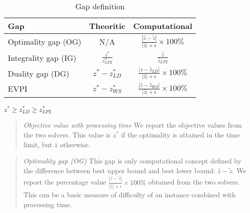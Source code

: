 \begin{table}[H]
	\centering
	\caption{Gap definition}
	\label{table:gap}
	\begin{tabular}{@{}lcc@{}}
		\toprule
		Gap                  & Theoritic  & Computational  \\ \midrule
		Optimality gap (OG)  & N/A & $\frac{|\hat{z}-\tilde{z}|}{|\hat{z}|+\epsilon}\times 100\%$   \\
		Integrality gap (IG) &  $\frac{z^*}{z^*_{LP2}}$          &        $\frac{\hat{z}}{\hat{z}_{LP2}}$       \\
		Duality gap (DG)     &      $z^*-z^*_{LD}$     &        $\frac{|\hat{z}-\hat{z}_{LD}|}{|\hat{z}|+\epsilon}\times 100\%$        \\
		EVPI                 &      $z^*-z^*_{WS}$      &       $\frac{|\hat{z}-\hat{z}_{WS}|}{|\hat{z}|+\epsilon}\times 100\%$         \\ \bottomrule
	\end{tabular}
\end{table}

$z^* \geq z^*_{LD} \geq z^*_{LP2}$

\begin{quote}
	\noindent\textit{Objective value with processing time} We report the objective values from the two solvers. This value is $z^*$ if the optimality is attained in the time limit, but $\hat{z}$ otherwise.
\end{quote}

\begin{quote}
	\noindent\textit{Optimality gap (OG)} This gap is only computational concept defined by the difference between best upper bound and best lower bound: $\hat{z}-\tilde{z}$. We report the percentage value $\frac{|\hat{z}-\tilde{z}|}{|\hat{z}|+\epsilon}\times 100\%$ obtained from the two solvers. This can be a basic measure of difficulty of an instance combined with processing time.
\end{quote}


